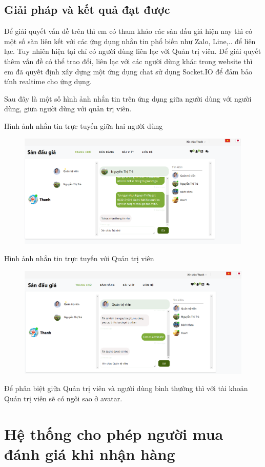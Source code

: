 \documentclass[../DoAn.tex]{subfiles}
\begin{document}
\subsection{Giải pháp và kết quả đạt được}
Để giải quyết vấn đề trên thì em có tham khảo các sàn đấu giá hiện nay thì có một số sàn liên kết với các ứng dụng nhắn tin phổ biến như Zalo, Line,.. để liên lạc. Tuy nhiên hiện tại chỉ có người dùng liên lạc với Quản trị viên. Để giải quyết thêm vấn đề có thể trao đổi, liên lạc với các người dùng khác trong website thì em đã quyết định xây dựng một ứng dụng chat sử dụng Socket.IO để đảm bảo tính realtime cho ứng dụng.

Sau đây là một số hình ảnh nhắn tin trên ứng dụng giữa người dùng với người dùng, giữa người dùng với quản trị viên. 

Hình ảnh nhắn tin trực tuyến giữa hai người dùng
\begin{figure}[H]
    \centering
    \includegraphics[width=0.75\linewidth,height=5.45cm]{Hinhve/chatuser.png}
\end{figure}
Hình ảnh nhắn tin trực tuyến với Quản trị viên
\begin{figure}[H]
    \centering
    \includegraphics[width=0.75\linewidth,height=5.32cm]{Hinhve/chatadmin.png}
\end{figure}
Để phân biệt giữa Quản trị viên và người dùng bình thường thì với tài khoản Quản trị viên sẽ có ngôi sao ở avatar.
\section{Hệ thống cho phép người mua đánh giá khi nhận hàng}
\end{document}
